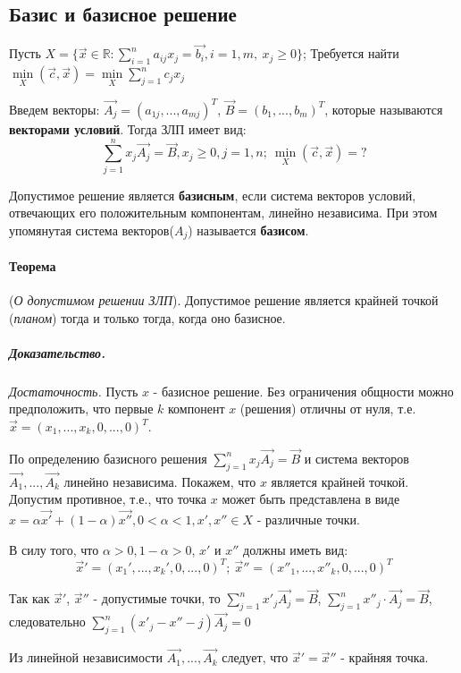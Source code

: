 \documentclass[a4paper, 14pt]{extarticle}
\numberwithin{equation}{section}
\begin{document}
\subsection{Базис и базисное решение}
Пусть $ X = \{\vec{x} \in \mathbb{R}: \sum^{n}_{i=1} a_{ij} x_j = \vec{b_i}, i = 1,m, \ x_j \ge 0 \} $; Требуется найти $ \min\limits_{X} (\vec{c}, \vec{x}) = \min\limits_X \sum^{n}_{j=1} c_j x_j $

Введем векторы: $ \vec{A_j} = (a_{1j}, ..., a_{mj})^T $, $ \vec{B} = (b_1, ..., b_m)^T $, которые называются \textbf{векторами условий}. Тогда ЗЛП имеет вид:
\[ \sum^{n}_{j=1} x_j \vec{A_j} = \vec{B}, x_j \ge 0, j=1,n; \ \min_X (\vec{c}, \vec{x}) = ? \]

Допустимое решение является \textbf{базисным}, если система векторов условий, отвечающих его положительным компонентам, линейно независима. При этом упомянутая система векторов($A_j$) называется \textbf{базисом}.

\paragraph{Теорема} (\textit{О допустимом решении ЗЛП}). Допустимое решение является крайней точкой (\textit{планом}) тогда и только тогда, когда оно базисное.

\subparagraph{Доказательство.} \textit{Достаточность.} Пусть $x$ - базисное решение. Без ограничения общности можно предположить, что первые $k$ компонент $x$ (решения) отличны от нуля, т.е. $\vec{x} = (x_1, ..., x_k, 0, ..., 0)^T$. 

По определению базисного решения $\sum\limits^n_{j=1} x_j \vec{A_j} = \vec{B}$ и система векторов $\vec{A_1},...,\vec{A_k}$ линейно независима. Покажем, что $x$ является крайней точкой. Допустим противное, т.е., что точка $x$ может быть представлена в виде $x = \alpha \vec{x'} + (1-\alpha)\vec{x''}, 0 < \alpha < 1, x', x'' \in X$ - различные точки.

В силу того, что $\alpha > 0, 1 - \alpha > 0$, $x'$ и $x''$ должны иметь вид: 
\[ \vec{x}' = (x_1', ..., x_k', 0, ..., 0)^T; \ \vec{x}''=(x''_1, ..., x''_k, 0, ..., 0)^T \]

Так как $ \vec{x}' $, $\vec{x}''$ - допустимые точки, то $\sum\limits^n_{j=1} x'_j \vec{A_j} = \vec{B}$, $\sum\limits^{n}_{j=1} x''_j \cdot \vec{A_j} = \vec{B}$, следовательно $\sum\limits^n_{j=1} (x'_j - x''-j) \vec{A_j} = 0$

Из линейной независимости $\vec{A_1}, ..., \vec{A_k}$ следует, что $\vec{x}' = \vec{x}''$ - крайняя точка.
\end{document}
